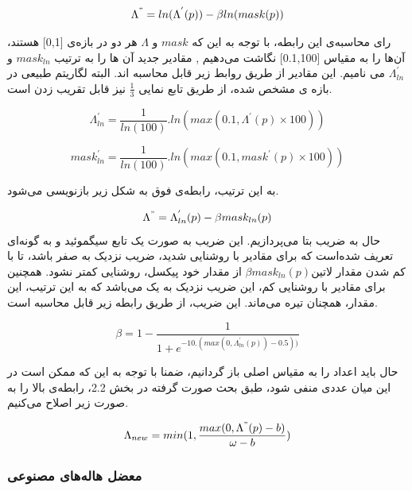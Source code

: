 \begin{equation}
	\Lambda^{"} = ln(\Lambda^{'}(p)) - \beta ln(mask(p))
\end{equation}

رای محاسبه‌ی این رابطه، با توجه به این که $mask$ و $\Lambda$ هر دو در بازه‌‌ی [0,1] هستند، آن‌ها را به مقیاس [0.1,100] نگاشت می‌دهیم , مقادیر جدید آن ها را به ترتیب $mask_{ln}$ و $\Lambda^{'}_{ln}$ می نامیم. این مقادیر از طریق روابط زیر قابل محاسبه اند. البته لگاریتم طبیعی در بازه ی مشخص شده، از طریق تابع نمایی $\frac{1}{3}$ نیز قابل تقریب زدن است.


\begin{equation}
	\Lambda^{'}_{ln} = \frac{1}{ln(100)}.ln(max(0.1, \Lambda^{'}(p)\times 100))
\end{equation}	

\begin{equation}	
	mask^{'}_{ln} = \frac{1}{ln(100)}.ln(max(0.1, mask^{'}(p)\times 100))	
\end{equation}

به این ترتیب، رابطه‌ی فوق به شکل زیر بازنویسی می‌شود.


\begin{equation}
	\Lambda^{"} = \Lambda^{'}_{ln}(p) - \beta mask_{ln}(p)
\end{equation}
حال به ضریب بتا می‌پردازیم.
این ضریب به  صورت یک تابع سیگموئید و به گونه‌ای تعریف شده‌است که برای مقادیر با روشنایی شدید، ضریب نزدیک به صفر باشد، تا با کم شدن مقدار 
‌لاتین{$ \beta mask_{ln}(p) $ }
از مقدار خود پیکسل، روشنایی کمتر نشود. همچنین برای مقادیر با روشنایی کم، این ضریب نزدیک به یک می‌باشد که به این ترتیب، این مقدار، همچنان تیره می‌ماند. این ضریب، از طریق رابطه زیر قابل محاسبه است.


\begin{equation}
	\beta = 1 - \frac{1}{1 + e^{-10.(max(0, \Lambda^{'}_{ln}(p)) - 0.5))}}
\end{equation}

حال باید اعداد را به مقیاس اصلی باز گردانیم، ضمنا با توجه به این که ممکن است در این میان عددی منفی شود، طبق بحث صورت گرفته در بخش 2.2، رابطه‌ی بالا را به صورت زیر اصلاح می‌کنیم.

\begin{equation}
	\Lambda_{new} = min(1, \frac{max(0, \Lambda^{"}(p) - b)}{\omega - b}) 
\end{equation}

\subsubsection{معضل هاله‌های مصنوعی  }

